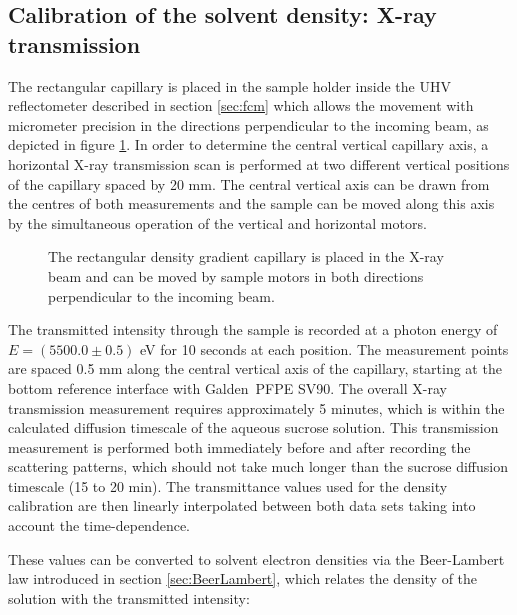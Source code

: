 \subsection{Calibration of the solvent density: X-ray transmission}
\label{sec:SolventCalibration}
The rectangular capillary is placed in the sample holder inside the UHV reflectometer described in section \ref{sec:fcm} which allows the movement with micrometer precision in the directions perpendicular to the incoming beam, as depicted in figure \ref{fig:DensityGradientCapillarySetup}. In order to determine the central vertical capillary axis, a horizontal X-ray transmission scan is performed at two different vertical positions of the capillary spaced by 20 mm. The central vertical axis can be drawn from the centres of both measurements and the sample can be moved along this axis by the simultaneous operation of the vertical and horizontal motors.

\begin{figure}%
	\centering
        	\def\svgwidth{0.7\linewidth}
		
		\caption[Scheme of the contrast variation technique in SAXS with a density gradient capillary.]{The rectangular density gradient capillary is placed in the X-ray beam and can be moved by sample motors in both directions perpendicular to the incoming beam.}
		\label{fig:DensityGradientCapillarySetup}
\end{figure}

The transmitted intensity through the sample is recorded at a photon energy of \(E = (5500.0 \pm  0.5)\) eV for 10 seconds at each position. The measurement points are spaced 0.5 mm along the central vertical axis of the capillary, starting at the bottom reference interface with Galden\textregistered\ PFPE SV90. The overall X-ray transmission measurement requires approximately 5 minutes, which is within the calculated diffusion timescale of the aqueous sucrose solution. This transmission measurement is performed both immediately before and after recording the scattering patterns, which should not take much longer than the sucrose diffusion timescale (15 to 20 min). The transmittance values used for the density calibration are then linearly interpolated between both data sets taking into account the time-dependence. 

These values can be converted to solvent electron densities via the Beer-Lambert law introduced in section \ref{sec:BeerLambert}, which relates the density of the solution with the transmitted intensity:

